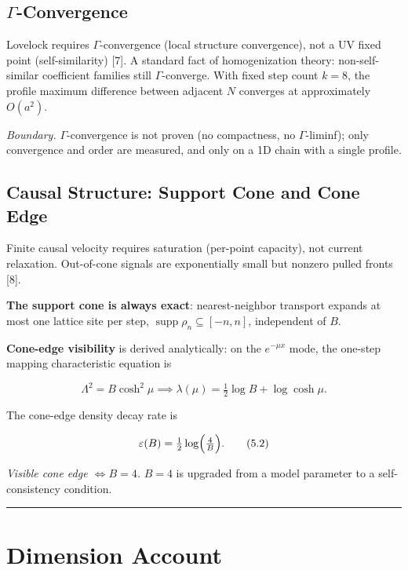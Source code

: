 \documentclass[
  11pt,
]{article}
\begin{document}
\subsection{\texorpdfstring{\(\Gamma\)-Convergence}{Gamma-Convergence}}\label{gamma-convergence}

Lovelock requires \(\Gamma\)-convergence (local structure convergence),
not a UV fixed point (self-similarity) {[}7{]}. A standard fact of
homogenization theory: non-self-similar coefficient families still
\(\Gamma\)-converge. With fixed step count \(k=8\), the profile maximum
difference between adjacent \(N\) converges at approximately \(O(a^2)\).

\emph{Boundary.} \(\Gamma\)-convergence is not proven (no compactness,
no \(\Gamma\)-liminf); only convergence and order are measured, and only
on a 1D chain with a single profile.

\subsection{Causal Structure: Support Cone and Cone
Edge}\label{causal-structure-support-cone-and-cone-edge}

Finite causal velocity requires saturation (per-point capacity), not
current relaxation. Out-of-cone signals are exponentially small but
nonzero pulled fronts {[}8{]}.

\textbf{The support cone is always exact}: nearest-neighbor transport
expands at most one lattice site per step,
\(\operatorname{supp}\rho_n\subseteq[-n,n]\), independent of \(B\).

\textbf{Cone-edge visibility} is derived analytically: on the
\(e^{-\mu x}\) mode, the one-step mapping characteristic equation is

\[
\Lambda^2=B\cosh^2\mu \implies \lambda(\mu)=\tfrac12\log B+\log\cosh\mu.
\tag{5.1}
\]

The cone-edge density decay rate is

\[
\varepsilon(B)=\tfrac12\log\Bigl(\tfrac4B\Bigr).
\tag{5.2}
\]

\emph{Visible cone edge \(\iff B=4\).} \(B=4\) is upgraded from a model
parameter to a self-consistency condition.

\begin{center}\rule{0.5\linewidth}{0.5pt}\end{center}

\section{Dimension Account}\label{dimension-account}
\end{document}

